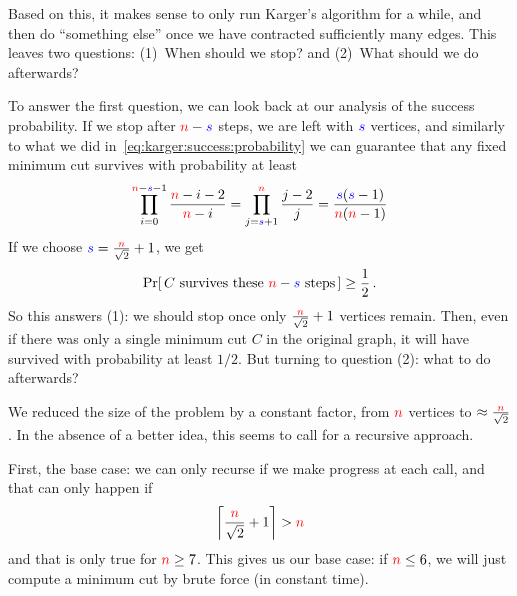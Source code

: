 Based on this, it makes sense to only run Karger's algorithm for a while, and then do ``something else'' once we have contracted sufficiently many edges. This leaves two questions: (1)~When should we stop? and (2)~What should we do afterwards?

To answer the first question, we can look back at our analysis of the success probability. If we stop after ${\textcolor{red}{n}}-\textcolor{blue}{s}$ steps, we are left with $\textcolor{blue}{s}$ vertices, and similarly to what we did in~\cref{eq:karger:success:probability} we can guarantee that any fixed minimum cut survives with probability at least
\[
\prod_{i=0}^{{\textcolor{red}{n}}-\textcolor{blue}{s}-1} \frac{\textcolor{red}{n}-i-2}{\textcolor{red}{n}-i}
= \prod_{j=\textcolor{blue}{s}+1}^{{\textcolor{red}{n}}} \frac{j-2}{j}
= \frac{\textcolor{blue}{s}(\textcolor{blue}{s}-1)}{\textcolor{red}{n}(\textcolor{red}{n}-1)}
\]
If we choose $\textcolor{blue}{s} = \frac{{\textcolor{red}{n}}}{\sqrt{2}}+1$, we get
\[
    \probaOf{C \text{ survives these }\ns-\blue{s}\text{ steps}} \geq \frac{1}{2}\,.
\]
So this answers (1): we should stop once only $\frac{{\textcolor{red}{n}}}{\sqrt{2}}+1$ vertices remain. Then, even if there was only a single minimum cut $C$ in the original graph, it will have survived with probability at least $1/2$. But turning to question (2): what to do afterwards?\smallskip

We reduced the size of the problem by a constant factor, from ${\textcolor{red}{n}}$ vertices to $\approx \frac{{\textcolor{red}{n}}}{\sqrt{2}}$. In the absence of a better idea, this seems to call for a recursive approach.

First, the base case: we can only recurse if we make progress at each call, and that can only happen if
\[
    \left\lceil \frac{{\textcolor{red}{n}}}{\sqrt{2}}+1 \right\rceil > {\textcolor{red}{n}}
\]
and that is only true for ${\textcolor{red}{n}} \geq 7$. This gives us our base case: if ${\textcolor{red}{n}} \leq 6$, we will just compute a minimum cut by brute force (in constant time).

